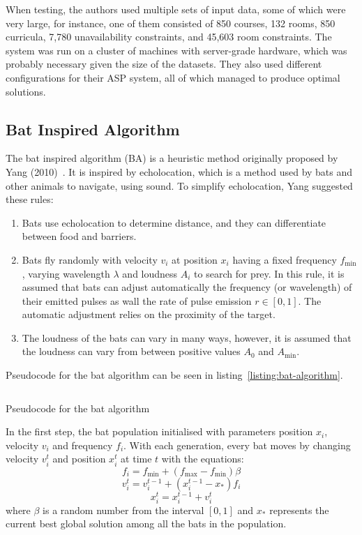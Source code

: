 When testing, the authors used multiple sets of input data, some of which were 
very large, for instance, one of them consisted of 850 courses, 132 rooms, 850 
curricula, 7,780 unavailability constraints, and 45,603 room constraints.
The system was run on a cluster of machines with server-grade hardware, which 
was probably necessary given the size of the datasets.
They also used different configurations for their ASP system, all of which 
managed to produce optimal solutions.

\subsection{Bat Inspired Algorithm}

The bat inspired algorithm (BA) is a heuristic method originally proposed by 
Yang (2010)~\cite{yang_bat}.
It is inspired by echolocation, which is a method used by bats and other animals
to navigate, using sound.
To simplify echolocation, Yang suggested these rules:
\begin{enumerate}
	\item Bats use echolocation to determine distance, and they can
		differentiate between food and barriers.
	\item Bats fly randomly with velocity \( v_i \) at position \( x_i \) having
		a fixed frequency \( f_{\min} \), varying wavelength \( \lambda \) and 
		loudness \( A_i \) to search for prey.
		In this rule, it is assumed that bats can adjust automatically the
		frequency (or wavelength) of their emitted pulses as wall the rate of
		pulse emission \( r \in [0,1] \).
		The automatic adjustment relies on the proximity of the target.
	\item The loudness of the bats can vary in many ways, however, it is assumed
		that the loudness can vary from between positive values \( A_0 \) and 
		\( A_{\min} \).
\end{enumerate}
Pseudocode for the bat algorithm can be seen in 
listing~\ref*{listing:bat-algorithm}.

\begin{listing}[!ht]
	\inputminted[linenos, fontsize=\footnotesize]{text}{code/bat-algorithm.txt}
	\caption{Pseudocode for the bat algorithm~\cite{ba_example}}
	\label{listing:bat-algorithm}
\end{listing}

In the first step, the bat population initialised with parameters position
\( x_i \), velocity \( v_i \) and frequency \( f_i \).
With each generation, every bat moves by changing velocity \( v_i^t \) and 
position \( x_i^t \) at time \( t \) with the equations:
\begin{equation}
	f_i = f_{\min} + (f_{\max} - f_{\min}) \beta
\end{equation}
\begin{equation}
	v_i^t = v_i^{t-1} + (x_i^{t-1} - x_*) f_i
\end{equation}
\begin{equation}
	x_i^t = x_i^{t-1} + v_i^t
\end{equation}
where \( \beta \) is a random number from the interval \( [0,1] \) and \( x_* \)
represents the current best global solution among all the bats in the
population.

